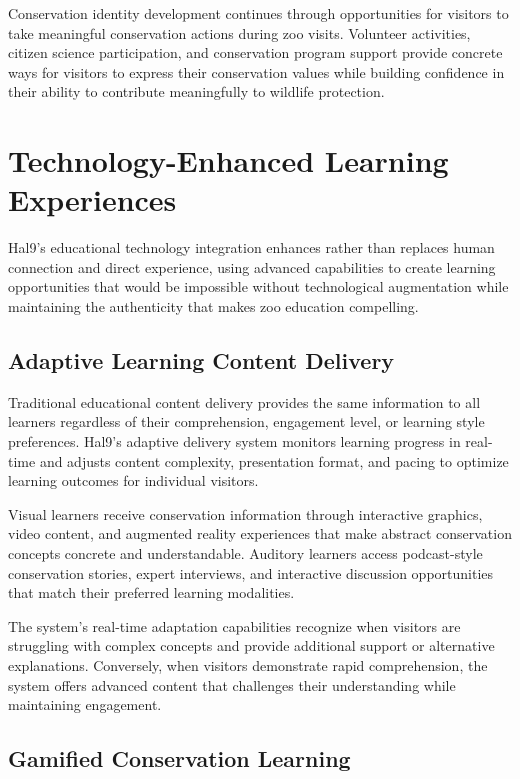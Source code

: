 \documentclass[
  Letterpaper,
]{scrbook}
\begin{document}
Conservation identity development continues through opportunities for
visitors to take meaningful conservation actions during zoo visits.
Volunteer activities, citizen science participation, and conservation
program support provide concrete ways for visitors to express their
conservation values while building confidence in their ability to
contribute meaningfully to wildlife protection.

\section{Technology-Enhanced Learning
Experiences}\label{technology-enhanced-learning-experiences}

Hal9's educational technology integration enhances rather than replaces
human connection and direct experience, using advanced capabilities to
create learning opportunities that would be impossible without
technological augmentation while maintaining the authenticity that makes
zoo education compelling.

\subsection{Adaptive Learning Content
Delivery}\label{adaptive-learning-content-delivery}

Traditional educational content delivery provides the same information
to all learners regardless of their comprehension, engagement level, or
learning style preferences. Hal9's adaptive delivery system monitors
learning progress in real-time and adjusts content complexity,
presentation format, and pacing to optimize learning outcomes for
individual visitors.

Visual learners receive conservation information through interactive
graphics, video content, and augmented reality experiences that make
abstract conservation concepts concrete and understandable. Auditory
learners access podcast-style conservation stories, expert interviews,
and interactive discussion opportunities that match their preferred
learning modalities.

The system's real-time adaptation capabilities recognize when visitors
are struggling with complex concepts and provide additional support or
alternative explanations. Conversely, when visitors demonstrate rapid
comprehension, the system offers advanced content that challenges their
understanding while maintaining engagement.

\subsection{Gamified Conservation
Learning}\label{gamified-conservation-learning}
\end{document}
